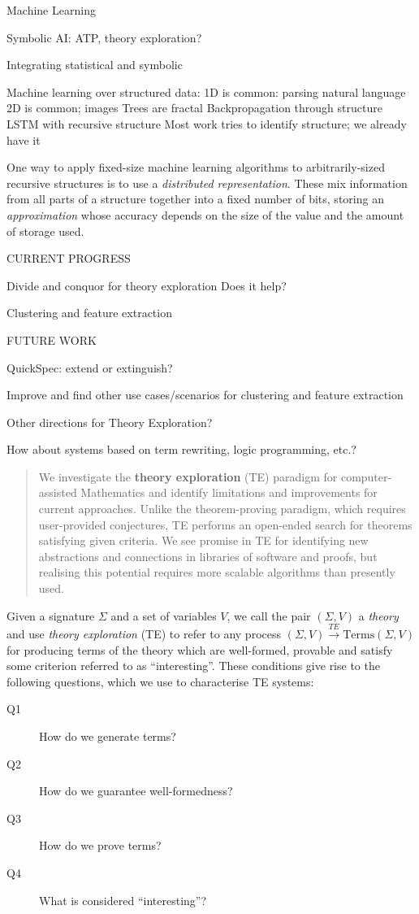 \documentclass[]{article}
\begin{document}
Machine Learning

Symbolic AI: ATP, theory exploration?

Integrating statistical and symbolic

Machine learning over structured data:
1D is common: parsing natural language
2D is common; images
Trees are fractal
Backpropagation through structure
LSTM with recursive structure
Most work tries to identify structure; we already have it

One way to apply fixed-size machine learning algorithms to arbitrarily-sized recursive structures is to use a \emph{distributed representation}. These mix information from all parts of a structure together into a fixed number of bits, storing an \emph{approximation} whose accuracy depends on the size of the value and the amount of storage used.

CURRENT PROGRESS

Divide and conquor for theory exploration
Does it help?

Clustering and feature extraction

FUTURE WORK

QuickSpec: extend or extinguish?

Improve and find other use cases/scenarios for clustering and feature extraction

Other directions for Theory Exploration?

How about systems based on term rewriting, logic programming, etc.?

\begin{abstract}
We investigate the \textbf{theory exploration} (TE)
paradigm for computer-assisted Mathematics and identify limitations and
improvements for current approaches. Unlike the theorem-proving paradigm,
which requires user-provided conjectures, TE performs an open-ended
search for theorems satisfying given criteria. We see promise in TE for
identifying new abstractions and connections in libraries of software
and proofs, but realising this potential requires more scalable
algorithms than presently used.
\end{abstract}

Given a signature $\Sigma$ and a set of variables $V$, we call the pair
$(\Sigma, V)$ a \emph{theory} and use \emph{theory exploration} (TE) to refer
to any process $(\Sigma, V) \overset{TE}{\rightarrow} \text{Terms}(\Sigma, V)$
for producing terms of the theory which are well-formed, provable and satisfy
some criterion referred to as ``interesting''. These conditions give rise to the
following questions, which we use to characterise TE systems:
\begin{description}
\item [Q1] \label{Q1} How do we generate terms?
\item [Q2] \label{Q2} How do we guarantee well-formedness?
\item [Q3] \label{Q3} How do we prove terms?
\item [Q4] \label{Q4} What is considered ``interesting''?
\end{description}
\end{document}
